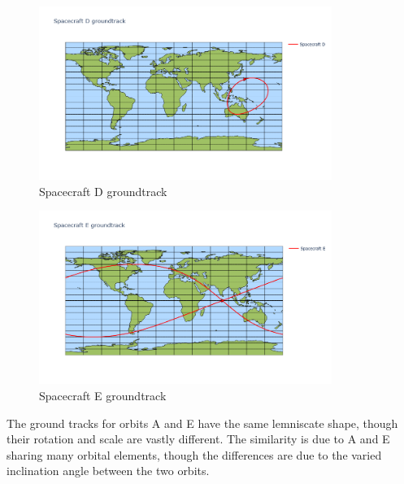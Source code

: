 \begin{hwkProblem}{2}{}
	\begin{figure}[H]
		\begin{center}
			\includegraphics[width=0.85\textwidth]{./images/s02d.png}
		\end{center}
		\caption{Spacecraft D groundtrack}\label{fig:s02d}
	\end{figure}

	

	\hwkPart

	\begin{figure}[H]
		\begin{center}
			\includegraphics[width=0.85\textwidth]{./images/s02e.png}
		\end{center}
		\caption{Spacecraft E groundtrack}\label{fig:s02e}
	\end{figure}

	

	\hwkPart

	The ground tracks for orbits A and E have the same lemniscate shape, though their rotation and scale are vastly different. The similarity is due to A and E sharing many orbital elements, though the differences are due to the varied inclination angle between the two orbits.

\end{hwkProblem}
